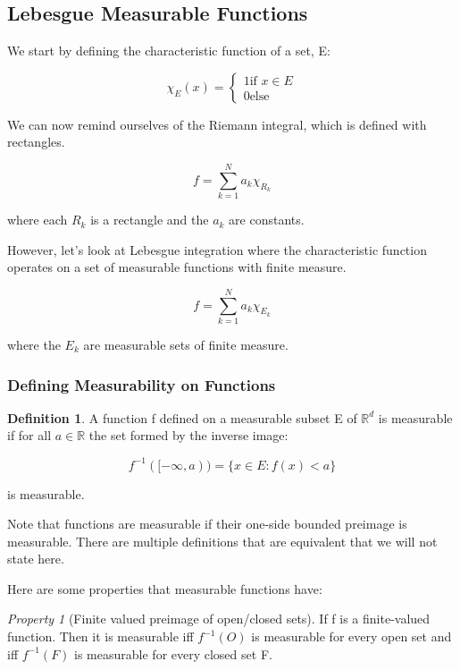 \documentclass[class=article, crop=false]{standalone}
\theoremstyle{definition}
\newtheorem{definition}{Definition}[section]
\theoremstyle{remark}
\theoremstyle{lemma}
\theoremstyle{theorem}
\theoremstyle{corollary}
\theoremstyle{property}
\newtheorem*{property}{Property}
\begin{document}
	\subsection{Lebesgue Measurable Functions}
		We start by defining the characteristic function of a set, E:

			$$\chi_E(x) = \begin{cases} 1 \mbox{if } x \in E \\ 0 \mbox{else} \end{cases}$$

		We can now remind ourselves of the Riemann integral, which is defined with rectangles.

			$$f = \sum_{k=1}^N a_k \chi_{R_k}$$

		where each $R_k$ is a rectangle and the $a_k$ are constants.

		However, let's look at Lebesgue integration where the characteristic function operates on a set of measurable functions with finite measure.

			$$f = \sum_{k=1}^N a_k \chi_{E_k}$$

		where the $E_k$ are measurable sets of finite measure.

		\subsubsection{Defining Measurability on Functions}
			\begin{definition}
				A function f defined on a measurable subset E of $\mathbb{R}^d$ is measurable if for all $a \in \mathbb{R}$ the set formed by the inverse image:

				$$f^{-1}([-\infty, a)) = \{x \in E: f(x) < a\}$$

				is measurable.
			\end{definition}

			Note that functions are measurable if their one-side bounded preimage is measurable. There are multiple definitions that are equivalent that we will not state here.

			Here are some properties that measurable functions have:

			\begin{property}[Finite valued preimage of open/closed sets]
				If f is a finite-valued function. Then it is measurable iff $f^{-1}(O)$ is measurable for every open set and iff $f^{-1}(F)$ is measurable for every closed set F.
			\end{property}
\end{document}
